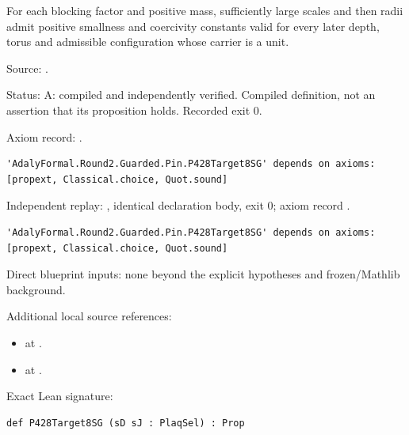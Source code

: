 \begin{definition}[bp-003]
\label{bp-003}
\uses{}
\leanok
For each blocking factor and positive mass, sufficiently large scales and then radii admit positive smallness and coercivity constants valid for every later depth, torus and admissible configuration whose carrier is a unit.

\par Source: \texttt{}.
\par Status: A: compiled and independently verified. Compiled definition, not an assertion that its proposition holds. Recorded exit 0.
\par Axiom record: \texttt{}.
\begin{verbatim}
'AdalyFormal.Round2.Guarded.Pin.P428Target8SG' depends on axioms: [propext, Classical.choice, Quot.sound]
\end{verbatim}
\par Independent replay: \texttt{}, identical declaration body, exit 0; axiom record \texttt{}.
\begin{verbatim}
'AdalyFormal.Round2.Guarded.Pin.P428Target8SG' depends on axioms: [propext, Classical.choice, Quot.sound]
\end{verbatim}
\par Direct blueprint inputs: none beyond the explicit hypotheses and frozen/Mathlib background.
\par Additional local source references:
\begin{itemize}
\item \texttt{} at \texttt{}.
\item \texttt{} at \texttt{}.
\end{itemize}
\par Exact Lean signature:
\begin{verbatim}
def P428Target8SG (sD sJ : PlaqSel) : Prop
\end{verbatim}
\end{definition}

